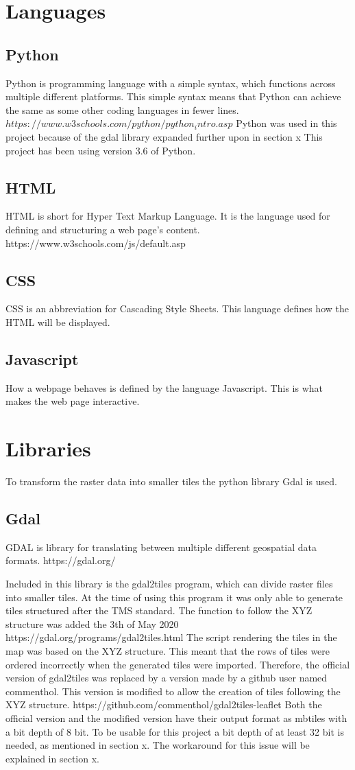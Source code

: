 \section{Languages}
\subsection*{Python}
Python is programming language with a simple syntax, which functions across multiple different platforms. This simple syntax means that Python can achieve the same as some other coding languages in fewer lines. $https://www.w3schools.com/python/python_intro.asp$
Python was used in this project because of the gdal library expanded further upon in section x
This project has been using version 3.6 of Python. 
\subsection*{HTML}
HTML is short for Hyper Text Markup Language. It is the language used for defining and structuring a web page’s content.
https://www.w3schools.com/js/default.asp
\subsection*{CSS}
CSS is an abbreviation for Cascading Style Sheets. This language defines how the HTML will be displayed.
\subsection*{Javascript}
How a webpage behaves is defined by the language Javascript.  This is what makes the web page interactive. 
\citep{CPL}

\section{Libraries}
To transform the raster data into smaller tiles the python library Gdal is used. 
\subsection*{Gdal}
GDAL is library for translating between multiple different geospatial data formats. https://gdal.org/ 

Included in this library is the gdal2tiles program, which can divide raster files into smaller tiles. 
At the time of using this program it was only able to generate tiles structured after the TMS standard. The function to follow the XYZ structure was added the 3th of May 2020 https://gdal.org/programs/gdal2tiles.html
The script rendering the tiles in the map was based on the XYZ structure. This meant that the rows of tiles were ordered incorrectly when the generated tiles were imported. Therefore, the official version of gdal2tiles was replaced by a version made by a github user named commenthol. This version is modified to allow the creation of tiles following the XYZ structure. 
https://github.com/commenthol/gdal2tiles-leaflet
Both the official version and the modified version have their output format as mbtiles with a bit depth of 8 bit. To be usable for this project a bit depth of at least 32 bit is needed, as mentioned in section x. The workaround for this issue will be explained in section x. 
